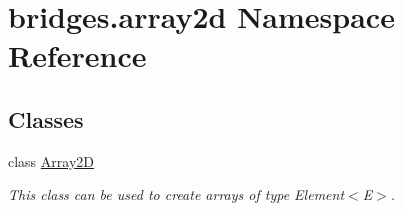 \hypertarget{namespacebridges_1_1array2d}{}\section{bridges.\+array2d Namespace Reference}
\label{namespacebridges_1_1array2d}
\subsection*{Classes}
\begin{DoxyCompactItemize}
\item 
class \hyperlink{classbridges_1_1array2d_1_1_array2_d}{Array2D}
\begin{DoxyCompactList}\small\item\em This class can be used to create arrays of type Element$<$\+E$>$. \end{DoxyCompactList}\end{DoxyCompactItemize}
